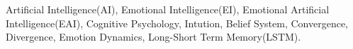 Artificial Intelligence(AI), Emotional Intelligence(EI), Emotional Artificial Intelligence(EAI), Cognitive Psychology, Intution, Belief System, Convergence, Divergence, Emotion Dynamics, Long-Short Term Memory(LSTM).